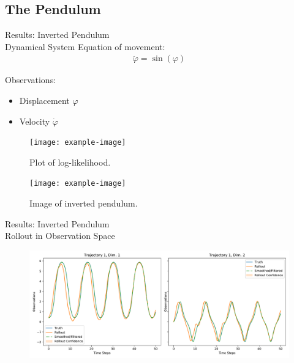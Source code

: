 \documentclass[
	aspectratio=43,
	color={accentcolor=1c},
	logo=false,
	colorframetitle=true,
]{tudabeamer}
\begin{document}
		\subsection{The Pendulum}
			\begin{frame}{Results: Inverted Pendulum \\ Dynamical System}
				Equation of movement:
				\begin{align*}
					\ddot{\varphi} = \sin(\varphi)
				\end{align*}

				\begin{minipage}{0.49\textwidth}
					Observations:
					\begin{itemize}
						\item Displacement \tabto{2.5cm} \(\varphi\)
						\item Velocity     \tabto{2.5cm} \(\dot{\varphi}\)
					\end{itemize}
					\begin{figure}
						\centering
						\texttt{[image: example-image]}
						\caption{Plot of log-likelihood.} %
					\end{figure}
				\end{minipage}
				\begin{minipage}{0.49\textwidth}
					\begin{figure}
						\centering
						\texttt{[image: example-image]}
						\caption{Image of inverted pendulum.} %
					\end{figure}
				\end{minipage}
			\end{frame}


			\begin{frame}{Results: Inverted Pendulum \\ Rollout in Observation Space}
				\vspace{-0.4cm}
				\begin{figure}
					\centering
					\includegraphics[width = \textwidth]{figures/results/pendulum/rollout-observations.pdf}
				\end{figure}
			\end{frame}
\end{document}
